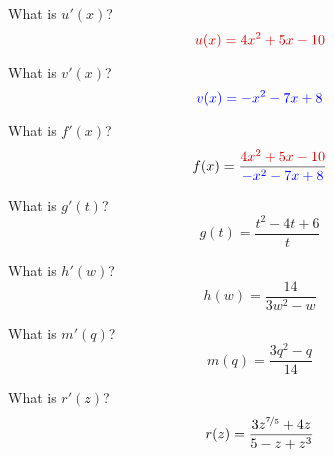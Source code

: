 
\begin{ProblemSet}[pencil space=2in]

 \begin{Problem}[pencil space=1in]
  What is $u'(x)$?
  \begin{equation*}
   \LeftStyle{u(x) = 4 x^2 + 5 x - 10}
  \end{equation*}
 \end{Problem}

 \begin{Problem}[pencil space=1in]
  What is $v'(x)$?
  \begin{equation*}
   \textcolor{blue}{v(x) = - x^2 - 7 x + 8}
  \end{equation*}
 \end{Problem}

 \begin{Problem}[pencil space=3in]
  What is $f'(x)$?
  \begin{equation*}
   f(x) = \frac{
    \LeftStyle{4 x^2 + 5 x - 10}
   }{
    \RightStyle{- x^2 - 7 x + 8}
   }
  \end{equation*}
 \end{Problem}

 \begin{Problem}
  What is $g'(t)$?
  \begin{equation*}
   g(t) = \frac{t^2 - 4t + 6}{t}
  \end{equation*}
 \end{Problem}

 \begin{Problem}
  What is $h'(w)$?
  \begin{equation*}
   h(w) = \frac{14}{3w^2 - w}
  \end{equation*}
 \end{Problem}

 \begin{Problem}
  What is $m'(q)$?
  \begin{equation*}
   m(q) = \frac{3q^2 - q}{14}
  \end{equation*}
 \end{Problem}

 \begin{Problem}
  What is $r'(z)$?
  \begin{equation*}
   r(z) = \frac{3z^{\nicefrac{7}{5}} + 4z}{5 - z + z^3}
  \end{equation*}
 \end{Problem}

\end{ProblemSet}

